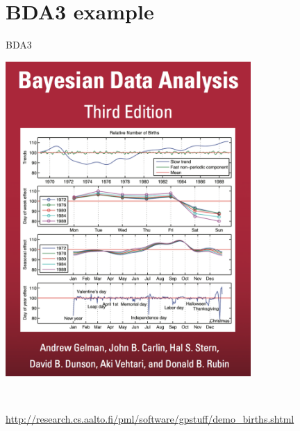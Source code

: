 \documentclass[11pt,ignorenonframetext,]{beamer}
\begin{document}
\hypertarget{bda3-example}{%
\section{BDA3 example}\label{bda3-example}}

\begin{frame}{%
\protect\hypertarget{bda3}{%
BDA3}}

\begin{center}
\includegraphics[width=0.7\textwidth]{figs/bda_cover.png} 

$~$

\vspace{-3mm}
\url{http://research.cs.aalto.fi/pml/software/gpstuff/demo_births.shtml}
\end{center}

\end{frame}
\end{document}
